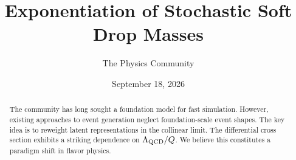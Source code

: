 \documentclass[11pt]{article}
\title{Exponentiation of Stochastic Soft Drop Masses}
\author{The Physics Community}
\date{September 18, 2026}
\numberwithin{equation}{section}
\theoremstyle{definition}
\theoremstyle{remark}
\begin{document}
\maketitle
\begin{abstract}
The community has long sought a foundation model for fast simulation.
However, existing approaches to event generation neglect
foundation-scale event shapes. The key idea is to reweight latent
representations in the collinear limit. The differential cross section
exhibits a striking dependence on $\Lambda_{\rm QCD}/Q$. We believe this
constitutes a paradigm shift in flavor physics.
\end{abstract}
\tableofcontents





\nocite{*}


\end{document}

